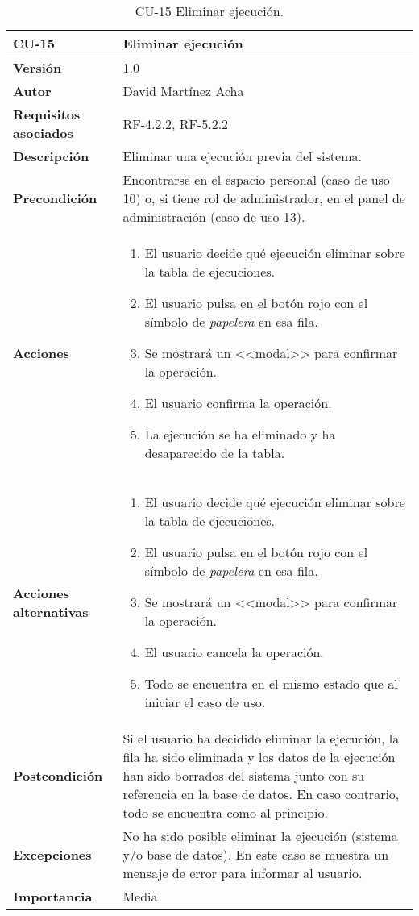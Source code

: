 \begin{table}[p]
	\centering
	\begin{tabularx}{\linewidth}{ p{} p{} }
		\toprule
		\textbf{CU-15}    & \textbf{Eliminar ejecución}\\
		\toprule
		\textbf{Versión}              & 1.0    \\
		\textbf{Autor}                & David Martínez Acha \\
		\textbf{Requisitos asociados} & RF-4.2.2, RF-5.2.2 \\
		\textbf{Descripción}          & Eliminar una ejecución previa del sistema. \\
		\textbf{Precondición}         & Encontrarse en el espacio personal (caso de uso 10) o, si tiene rol de administrador, en el panel de administración (caso de uso 13). \\
		\textbf{Acciones}             &
		\begin{enumerate}
			\def\labelenumi{\arabic{enumi}.}
			\tightlist
			\item El usuario decide qué ejecución eliminar sobre la tabla de ejecuciones.
			\item El usuario pulsa en el botón rojo con el símbolo de \textit{papelera} en esa fila.
			\item Se mostrará un <<modal>> para confirmar la operación.
			\item El usuario confirma la operación.
			\item La ejecución se ha eliminado y ha desaparecido de la tabla.
		\end{enumerate}\\
		\textbf{Acciones alternativas}&
		\begin{enumerate}
			\def\labelenumi{\arabic{enumi}.}
			\tightlist
			\item El usuario decide qué ejecución eliminar sobre la tabla de ejecuciones.
			\item El usuario pulsa en el botón rojo con el símbolo de \textit{papelera} en esa fila.
			\item Se mostrará un <<modal>> para confirmar la operación.
			\item El usuario cancela la operación.
			\item Todo se encuentra en el mismo estado que al iniciar el caso de uso.
		\end{enumerate}\\
		\textbf{Postcondición}        & Si el usuario ha decidido eliminar la ejecución, la fila ha sido eliminada y los datos de la ejecución han sido borrados del sistema junto con su referencia en la base de datos. 
		En caso contrario, todo se encuentra como al principio.\\
		\textbf{Excepciones}          & No ha sido posible eliminar la ejecución (sistema y/o base de datos). En este caso se muestra un mensaje de error para informar al usuario. \\
		\textbf{Importancia}          & Media \\
		\bottomrule
	\end{tabularx}
	\caption{CU-15 Eliminar ejecución.}
\end{table}

